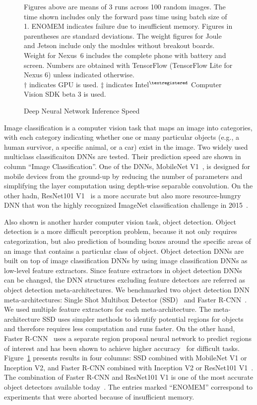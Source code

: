 \begin{figure}
\begin{captiontext}
Figures above are means of 3 runs across 100 random images. The time shown
includes only the forward pass time using batch size of 1. ENOMEM indicates
failure due to insufficient memory. Figures in parentheses are standard
deviations. The weight figures for Joule and Jetson include only the modules
without breakout boards. Weight for Nexus~6 includes the complete phone with
battery and screen. Numbers are obtained with TensorFlow (TensorFlow Lite for
Nexus 6) unless indicated otherwise. \\
$\dagger$ indicates GPU is used. $\ddagger$ indicates
Intel$^{\tiny\textregistered}$ Computer Vision SDK beta 3 is used.
\end{captiontext}
\caption{Deep Neural Network Inference Speed}
\label{fig:onboard-dnn-speed}
\end{figure}

Image classification is a computer vision task that maps an image into
categories, with each category indicating whether one or many particular objects
(e.g., a human survivor, a specific animal, or a car) exist in the image. Two
widely used multiclass classificaiton DNNs are tested. Their prediction speed
are shown in column ``Image Classification''. One of the DNNs, MobileNet
V1~\cite{Howard2017}, is designed for mobile devices from the ground-up by
reducing the number of parameters and simplifying the layer computation using
depth-wise separable convolution. On the other hadn, ResNet101 V1~\cite{He2016}
is a more accurate but also more resource-hungry DNN that won the highly
recognized ImageNet classification challenge in 2015~\cite{Russakovsky15}. 

Also shown is another harder computer vision task, object detection. Object
detection is a more difficult perception problem, because it not only requires
categorization, but also prediction of bounding boxes around the specific areas
of an image that contains a particular class of object. Object detection DNNs
are built on top of image classification DNNs by using image classification DNNs
as low-level feature extractors. Since feature extractors in object detection
DNNs can be changed, the DNN structures excluding feature detectors are referred
as object detection meta-architectures. We benchmarked two object detection DNN
meta-architectures: Single Shot Multibox Detector (SSD)~\cite{Liu2016} and
Faster R-CNN~\cite{Ren2015}. We used multiple feature extractors for each
meta-architecture. The meta-architecture SSD uses simpler methods to identify
potential regions for objects and therefore requires less computation and runs
faster. On the other hand, Faster R-CNN~\cite{Ren2015} uses a separate region
proposal neural network to predict regions of interest and has been shown to
achieve higher accuracy~\cite{Huang2017} for difficult tasks.
Figure~\ref{fig:onboard-dnn-speed} presents results in four columns: SSD
combined with MobileNet V1 or Inception V2, and Faster R-CNN combined with
Inception V2 or ResNet101 V1~\cite{He2016}. The combination of Faster R-CNN and
ResNet101 V1 is one of the most accurate object detectors available
today~\cite{Russakovsky15}. The entries marked ``{\sc ENOMEM}'' correspond to
experiments that were aborted because of insufficient memory.

